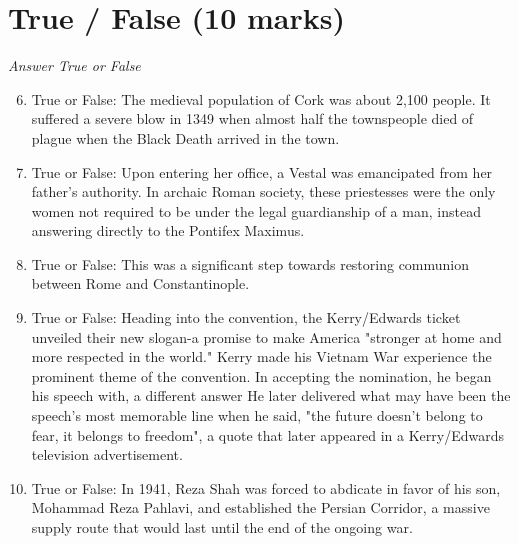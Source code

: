 \documentclass[12pt]{article}
\begin{document}
\section*{True / False (10 marks)}
\textit{Answer True or False}
\begin{enumerate}[label=\arabic*.]
\setcounter{enumi}{5}
\item True or False: The medieval population of Cork was about 2,100 people. It suffered a severe blow in 1349 when almost half the townspeople died of plague when the Black Death arrived in the town.
\item True or False: Upon entering her office, a Vestal was emancipated from her father's authority. In archaic Roman society, these priestesses were the only women not required to be under the legal guardianship of a man, instead answering directly to the Pontifex Maximus.
\item True or False: This was a significant step towards restoring communion between Rome and Constantinople.
\item True or False: Heading into the convention, the Kerry/Edwards ticket unveiled their new slogan-a promise to make America "stronger at home and more respected in the world." Kerry made his Vietnam War experience the prominent theme of the convention. In accepting the nomination, he began his speech with, a different answer He later delivered what may have been the speech's most memorable line when he said, "the future doesn't belong to fear, it belongs to freedom", a quote that later appeared in a Kerry/Edwards television advertisement.
\item True or False: In 1941, Reza Shah was forced to abdicate in favor of his son, Mohammad Reza Pahlavi, and established the Persian Corridor, a massive supply route that would last until the end of the ongoing war.
\end{enumerate}
\end{document}
